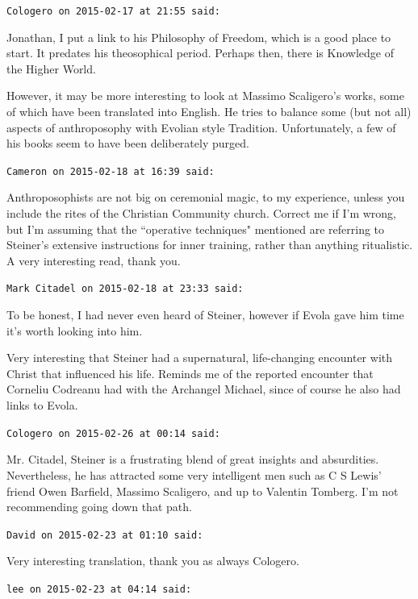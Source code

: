 \begin{footnotesize}
\begin{sffamily}
\hfill

\texttt{Cologero on 2015-02-17 at 21:55 said: }

Jonathan, I put a link to his Philosophy of Freedom, which is a good place to start. It predates his theosophical period. Perhaps then, there is Knowledge of the Higher World.

However, it may be more interesting to look at Massimo Scaligero's works, some of which have been translated into English. He tries to balance some (but not all) aspects of anthroposophy with Evolian style Tradition. Unfortunately, a few of his books seem to have been deliberately purged.


\hfill

\texttt{Cameron on 2015-02-18 at 16:39 said: }

Anthroposophists are not big on ceremonial magic, to my experience, unless you include the rites of the Christian Community church. Correct me if I'm wrong, but I'm assuming that the ``operative techniques" mentioned are referring to Steiner's extensive instructions for inner training, rather than anything ritualistic. A very interesting read, thank you.


\hfill

\texttt{Mark Citadel on 2015-02-18 at 23:33 said: }

To be honest, I had never even heard of Steiner, however if Evola gave him time it's worth looking into him.

Very interesting that Steiner had a supernatural, life-changing encounter with Christ that influenced his life. Reminds me of the reported encounter that Corneliu Codreanu had with the Archangel Michael, since of course he also had links to Evola.


\hfill

\texttt{Cologero on 2015-02-26 at 00:14 said: }

Mr. Citadel, Steiner is a frustrating blend of great insights and absurdities. Nevertheless, he has attracted some very intelligent men such as C S Lewis' friend Owen Barfield, Massimo Scaligero, and up to Valentin Tomberg. I'm not recommending going down that path.


\hfill

\texttt{David on 2015-02-23 at 01:10 said: }

Very interesting translation, thank you as always Cologero.


\hfill

\texttt{lee on 2015-02-23 at 04:14 said: }


\end{sffamily}
\end{footnotesize}
